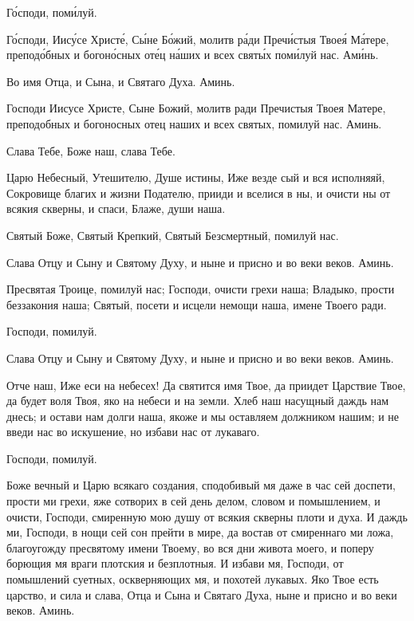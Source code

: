 \begin{mymulticols}
\slavainynen

Г\'{о}споди, пом\'{и}луй. 

Г\'{о}споди, Иис\'{у}се Христ\'{е}, С\'{ы}не Б\'{о}жий, молитв р\'{а}ди Преч\'{и}стыя Твое\'{я} М\'{а}тере, препод\'{о}бных и богон\'{о}сных от\'{е}ц н\'{а}ших и всех свят\'{ы}х пом\'{и}луй нас. Ам\'{и}нь.

\end{mymulticols}

\mychapterending


\begin{mymulticols}


Во имя Отца, и Сына, и Святаго Духа. Аминь.

Господи Иисусе Христе, Сыне Божий, молитв ради Пречистыя Твоея Матере, преподобных и богоносных отец наших и всех святых, помилуй нас. Аминь.

Слава Тебе, Боже наш, слава Тебе.

Царю Небесный, Утешителю, Душе истины, Иже везде сый и вся исполняяй, Сокровище благих и жизни Подателю, прииди и вселися в ны, и очисти ны от всякия скверны, и спаси, Блаже, души наша.

Святый Боже, Святый Крепкий, Святый Безсмертный, помилуй нас. 

Слава Отцу и Сыну и Святому Духу, и ныне и присно и во веки веков. Аминь.

Пресвятая Троице, помилуй нас; Господи, очисти грехи наша; Владыко, прости беззакония наша; Святый, посети и исцели немощи наша, имене Твоего ради.

Господи, помилуй. 

Слава Отцу и Сыну и Святому Духу, и ныне и присно и во веки веков. Аминь.

Отче наш, Иже еси на небесех! Да святится имя Твое, да приидет Царствие Твое, да будет воля Твоя, яко на небеси и на земли. Хлеб наш насущный даждь нам днесь; и остави нам долги наша, якоже и мы оставляем должником нашим; и не введи нас во искушение, но избави нас от лукаваго.


\TroparPomilujNas

Господи, помилуй. 


Боже вечный и Царю всякаго создания, сподобивый мя даже в час сей доспети, прости ми грехи, яже сотворих в сей день делом, словом и помышлением, и очисти, Господи, смиренную мою душу от всякия скверны плоти и духа. И даждь ми, Господи, в нощи сей сон прейти в мире, да востав от смиреннаго ми ложа, благоугожду пресвятому имени Твоему, во вся дни живота моего, и поперу борющия мя враги плотския и безплотныя. И избави мя, Господи, от помышлений суетных, оскверняющих мя, и похотей лукавых. Яко Твое есть царство, и сила и слава, Отца и Сына и Святаго Духа, ныне и присно и во веки веков. Аминь.


\end{mymulticols}
